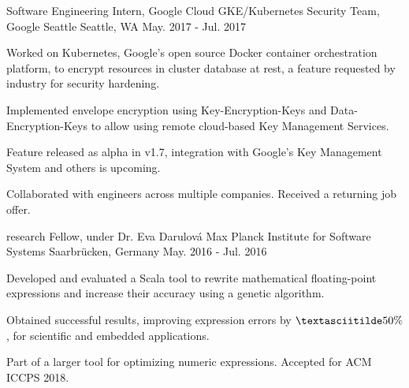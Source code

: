 
\vspace{-0.2cm}


\begin{cventries}


  \cventry
  {Software Engineering Intern, Google Cloud}
  {GKE/Kubernetes Security Team, Google Seattle}
  {Seattle, WA}
  {May. 2017 - Jul. 2017}
  {
    \begin{cvitems}
    \item {Worked on Kubernetes, Google's open source Docker container orchestration platform, to encrypt resources in cluster database at rest, a feature requested by industry for security hardening.}
    \item {Implemented envelope encryption using Key-Encryption-Keys and Data-Encryption-Keys to allow using remote cloud-based Key Management Services.}
    \item {Feature released as alpha in v1.7, integration with Google's Key Management System and others is upcoming.}
    \item {Collaborated with engineers across multiple companies. Received a returning job offer.}
    \end{cvitems}
  }

  \cventry
  {research Fellow, under Dr. Eva Darulová} %
  {Max Planck Institute for Software Systems} %
  {Saarbrücken, Germany} %
  {May. 2016 - Jul. 2016} %
  {
    \begin{cvitems}
    \item {Developed and evaluated a Scala tool to rewrite
    mathematical floating-point expressions and increase their
    accuracy using a genetic algorithm.}
    \item {Obtained successful results, improving expression errors by
    $\textasciitilde50\%$, for scientific and embedded
    applications.}
    \item {Part of a larger tool for optimizing numeric expressions. Accepted for ACM ICCPS 2018.}
    \end{cvitems}
  }


\end{cventries}
